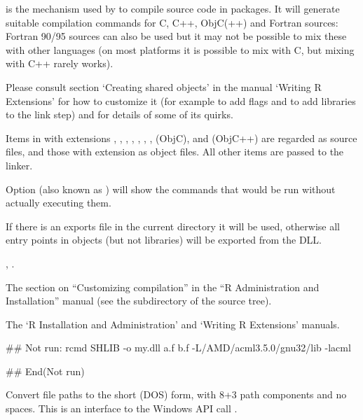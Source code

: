 %
\begin{Details}\relax
{} is the mechanism used by  to
compile source code in packages.  It will generate suitable
compilation commands for C, C++, ObjC(++) and Fortran sources: Fortran
90/95 sources can also be used but it may not be possible to mix these
with other languages (on most platforms it is possible to mix with C,
but mixing with C++ rarely works).

Please consult section `Creating shared objects' in the manual
`Writing R Extensions' for how to customize it (for example to
add  flags and to add libraries to the link step) and for
details of some of its quirks.

Items in  with extensions , ,
, , , , , 
(ObjC),  and  (ObjC++) are regarded as source
files, and those with extension  as object files.  All other
items are passed to the linker.

Option  (also known as ) will show the
commands that would be run without actually executing them.

If there is an exports file  in the current
directory it will be used, otherwise all entry points in objects (but
not libraries) will be exported from the DLL.
\end{Details}
%
\begin{SeeAlso}\relax
{},
.

The section on ``Customizing compilation'' in the ``R
Administration and Installation'' manual (see the 
subdirectory of the \R{} source tree).

The `R Installation and Administration' and `Writing R 
Extensions' manuals.
\end{SeeAlso}
%
\begin{Examples}
\begin{ExampleCode}
## Not run: 
rcmd SHLIB -o my.dll a.f b.f -L/AMD/acml3.5.0/gnu32/lib -lacml

## End(Not run)
\end{ExampleCode}
\end{Examples}
%
\begin{Description}\relax
Convert file paths to the short (DOS) form, with 8+3 path components
and no spaces.  This is an interface to the Windows API call
.
\end{Description}
